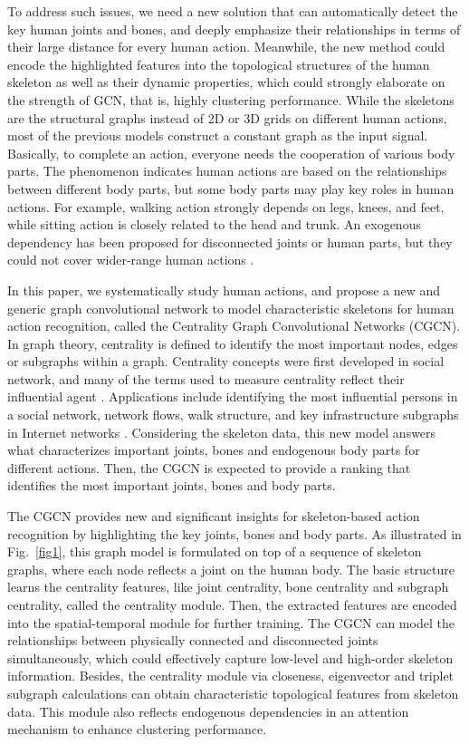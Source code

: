 \documentclass[runningheads]{llncs}
\begin{document}
To address such issues, we need a new solution that can automatically detect the key human joints and bones, and deeply emphasize their relationships in terms of their large distance for every human action. Meanwhile, the new method could encode the highlighted features into the topological structures of the human skeleton as well as their dynamic properties, which could strongly elaborate on the strength of GCN, that is, highly clustering performance. While the skeletons are the structural graphs instead of 2D or 3D grids on different human actions, most of the previous models construct a constant graph as the input signal. Basically, to complete an action, everyone needs the cooperation of various body parts. The phenomenon indicates human actions are based on the relationships between different body parts, but some body parts may play key roles in human actions. For example,  walking action strongly depends on legs, knees, and feet, while sitting action is closely related to the head and trunk. An exogenous dependency has been proposed for disconnected joints or human parts, but they could not cover wider-range human actions \cite{zhang2019semantics}. 

In this paper, we systematically study human actions, and propose a new and generic graph convolutional network to model characteristic skeletons for human action recognition, called the Centrality Graph Convolutional Networks (CGCN). In graph theory, centrality is defined to identify the most important nodes, edges or subgraphs within a graph. Centrality concepts were first developed in social network, and many of the terms used to measure centrality reflect their influential agent \cite{newman2018networks}. Applications include identifying the most influential persons in a social network, network flows, walk structure, and key infrastructure subgraphs in Internet networks \cite{okamoto2008ranking,newman2005measure,you2016distributed}. Considering the skeleton data, this new model answers what characterizes important joints, bones and endogenous body parts for different actions. Then, the CGCN is expected to provide a ranking that identifies the most important joints, bones and body parts.

The CGCN provides new and significant insights for skeleton-based action recognition by highlighting the key joints, bones and body parts. As illustrated in Fig.~\ref{fig1}, this graph model is formulated on top of a sequence of skeleton graphs, where each node reflects a joint on the human body. The basic structure learns the centrality features, like joint centrality, bone centrality and subgraph centrality, called the centrality module. Then, the extracted features are encoded into the spatial-temporal module for further training. The CGCN can model the relationships between physically connected and disconnected joints simultaneously, which could effectively capture low-level and high-order skeleton information. Besides, the centrality module via closeness, eigenvector and triplet subgraph calculations can obtain characteristic topological features from skeleton data. This module also reflects endogenous dependencies in an attention mechanism to enhance clustering performance.
\end{document}
